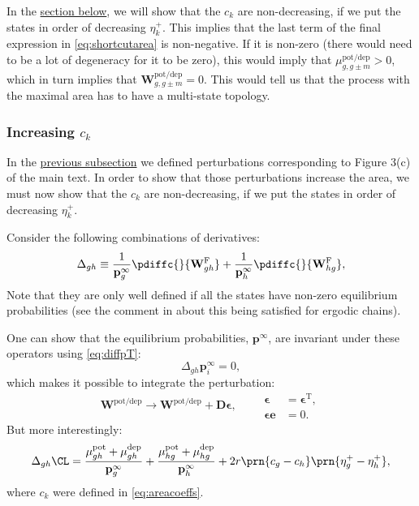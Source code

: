 \documentclass{article} %
\newcommand{\trans}{^\mathrm{T}}
\newcommand{\onev}{\mathbf{e}}
\newcommand{\pr}{\mathbf{p}}
\newcommand{\eq}{\pr^\infty}
\newcommand{\D}{\mathbf{D}}
\newcommand{\W}{\mathbf{W}}
\newcommand{\frg}{\W^{\mathrm{F}}}
\newcommand{\pot}{^{\text{pot}}}
\newcommand{\dep}{^{\text{dep}}}
\newcommand{\potdep}{^{\text{pot/dep}}}
\begin{document}
In the \hyperref[sec:areacoeffincr]{section below}, we will show that the $c_k$ are non-decreasing, if we put the states in order of decreasing $\eta^+_k$.
This implies that the last term of the final expression in \eqref{eq:shortcutarea} is non-negative.
If it is non-zero (there would need to be a lot of degeneracy for it to be zero), this would imply that $\mu\potdep _{g,g\pm m}>0$, which in turn implies that $\W\potdep _{g,g\pm m}=0$.
This would tell us that the process with the maximal area has to have a multi-state topology.

\subsubsection{Increasing \texorpdfstring{$c_k$}{c(k)}}\label{sec:areacoeffincr}

In the \hyperref[sec:shortcuts]{previous subsection} we defined perturbations corresponding to Figure 3(c) of the main text.
In order to show that those perturbations increase the area, we must now show that the $c_k$ are non-decreasing, if we put the states in order of decreasing $\eta^+_k$.

Consider the following combinations of derivatives:
%
\begin{align}
\label{eq:areacoeffincrderiv}
    \Delta_{gh} &\equiv
      \frac{1}{\eq_{g}} \pdiffc{}{\frg_{gh}}
      + \frac{1}{\eq_h} \pdiffc{}{\frg_{hg}}, \\
\end{align}
%
Note that they are only well defined if all the states have non-zero equilibrium probabilities (see the comment in  about this being satisfied for ergodic chains).

One can show that the equilibrium probabilities, $\eq$, are invariant under these operators using \eqref{eq:diffpT}:
%
\begin{equation}\label{eq:sareacoeffincrprob}
  \Delta_{gh} \eq_i = 0,
\end{equation}
%
which makes it possible to integrate the perturbation:
%
\begin{equation}\label{eq:areacoeffincrfinite}
  \W\potdep  \to \W\potdep  + \D\boldsymbol{\epsilon},
  \qquad
  \begin{aligned}
  \boldsymbol{\epsilon} &= \boldsymbol{\epsilon}\trans,
  \\
  \boldsymbol{\epsilon} \onev &= 0.
  \end{aligned}
\end{equation}
%
But more interestingly:
%
\begin{align}
\label{eq:areacoeffincr}
    \Delta_{gh}\CL &=
      \frac{\mu\pot _{gh}+\mu\dep _{gh}}{\eq_g} + \frac{\mu\pot _{hg}+\mu\dep _{hg}}{\eq_h}
      + 2r\prn{c_g-c_h}\prn{\eta^+_{g} - \eta^+_{h}},\\
\end{align}
%
where $c_k$ were defined in \eqref{eq:areacoeffs}.
\end{document}
